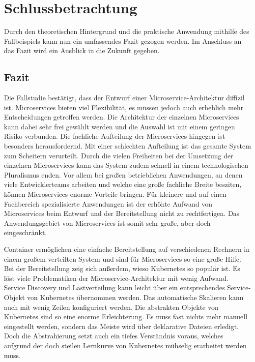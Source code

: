 \section{Schlussbetrachtung}

Durch den theoretischen Hintergrund und die praktische Anwendung mithilfe des Fallbeispiels kann nun ein umfassendes Fazit gezogen werden. Im Anschluss an das Fazit wird ein Ausblick in die Zukunft gegeben.

\subsection{Fazit}
Die Fallstudie bestätigt, dass der Entwurf einer Microservice-Architektur diffizil ist. Microservices bieten viel Flexibilität, es müssen jedoch auch erheblich mehr Entscheidungen getroffen werden. Die Architektur der einzelnen Microservices kann dabei sehr frei gewählt werden und die Auswahl ist mit einem geringen Risiko verbunden. Die fachliche Aufteilung der Microservices hingegen ist besonders herausfordernd. Mit einer schlechten Aufteilung ist das gesamte System zum Scheitern verurteilt. Durch die vielen Freiheiten bei der Umsetzung der einzelnen Microservices kann das System zudem schnell in einem technologischen Pluralismus enden. Vor allem bei großen betrieblichen Anwendungen, an denen viele Entwicklerteams arbeiten und welche eine große fachliche Breite besziten, können Microservices enorme Vorteile bringen. Für kleinere und auf einen Fachbereich spezialisierte Anwendungen ist der erhöhte Aufwand von Microservices beim Entwurf und der Bereitstellung nicht zu rechtfertigen. Das Anwendungsgebiet von Microservices ist somit sehr große, aber doch eingeschränkt.

Container ermöglichen eine einfache Bereitstellung auf verschiedenen Rechnern in einem großem verteilten System und sind für Microservices so eine große Hilfe. Bei der Bereitstellung zeig sich außerdem, wieso Kubernetes so populär ist. Es löst viele Problematiken der Microservice-Architektur mit wenig Aufwand. Service Discovery und Lastverteilung kann leicht über ein entsprechendes Service-Objekt von Kubernetes übernommen werden. Das automatische Skalieren kann auch mit wenig Zeilen konfiguriert werden. Die abstrakten Objekte von Kubernetes sind so eine enorme Erleichterung. Es muss fast nichts mehr manuell eingestellt werden, sondern das Meiste wird über deklarative Dateien erledigt. Doch die Abstrahierung setzt auch ein tiefes Verständnis voraus, welches aufgrund der doch steilen Lernkurve von Kubernetes mühselig erarbeitet werden muss.

